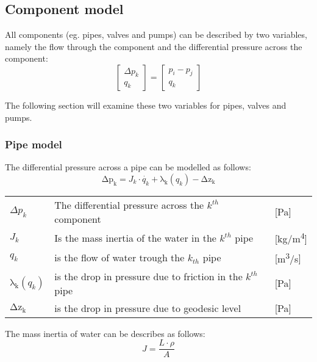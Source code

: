 \subsection{Component model}
All components (eg. pipes, valves and pumps) can be described by two variables, namely the flow through the component and the differential pressure across the component:
\begin{equation}
\begin{bmatrix} \Delta{p_{k}} \\ q_{k} \end{bmatrix} = 
\begin{bmatrix} p_{i} - p_{j} \\ q_{k} \end{bmatrix}    
\end{equation}

The following section will examine these two variables for pipes, valves and pumps.

\subsubsection{Pipe model}
The differential pressure across a pipe can be modelled as follows:
\begin{equation}
    \mathrm{\Delta{p_{k}}} = J_{k}\cdot\dot{q_{k}}+\mathrm{\lambda_{k}}(q_{k})-\mathrm{\Delta{z_{k}}}
    \label{eq:Delta_p_pipe}
\end{equation}


	\begin{center}
		\begin{tabular}{l p{8cm} l}
			
			$\Delta{p_{k}}$ & The differential pressure across the $k^{th}$ component & [\si{Pa}]\\ 
		  	${J_{k}}$ & Is the mass inertia of the water in the $k^{th}$ pipe & [\si{kg}/\si{m^{4}}] \\
		  	$q_{k}$ & is the flow of water trough the $k_{th}$ pipe & [{\si{\meter\cubed}/\si{s}}] \\
		  	$\mathrm{\lambda_{k}}(q_{k})$ & is the drop in pressure due to friction in the $k^{th}$ pipe & [\si{Pa}] \\
		  	$\mathrm{\Delta{z_{k}}}$ & is the drop in pressure due to geodesic level & [\si{Pa}]\\
			\end{tabular}
	\end{center}

The mass inertia of water can be describes as follows:
\begin{equation}
	J= \frac{L\cdot \rho}{A}
\end{equation}

